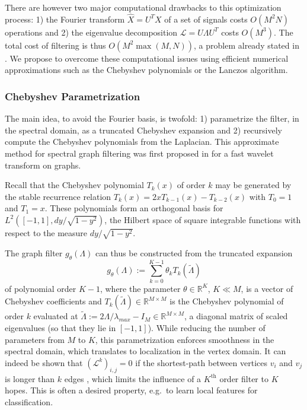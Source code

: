 \documentclass{article}
\renewcommand{\L}{\mathcal{L}}
\newcommand{\R}{\mathbb{R}}
\newcommand{\Xh}{\hat{X}}
\begin{document}
There are however two major computational drawbacks to this optimization
process: 1) the Fourier transform \(\Xh=U^TX\) of a set of signals costs
\(O(M^2N)\) operations and 2) the eigenvalue decomposition
\(\L = U \Lambda U^T\) costs \(O(M^3)\). The total cost of filtering is
thus \(O(M^2 \max(M,N))\), a problem already stated in
\citep{henaff_deep_2015}. We propose to overcome these computational
issues using efficient numerical approximations such as the Chebyshev
polynomials or the Lanczos algorithm.

\subsubsection{Chebyshev
Parametrization}\label{chebyshev-parametrization}

The main idea, to avoid the Fourier basis, is twofold: 1) parametrize
the filter, in the spectral domain, as a truncated Chebyshev expansion
and 2) recursively compute the Chebyshev polynomials from the Laplacian.
This approximate method for spectral graph filtering was first proposed
in \citep{hammond_wavelets_2011} for a fast wavelet transform on graphs.

Recall that the Chebyshev polynomial \(T_k(x)\) of order \(k\) may be
generated by the stable recurrence relation
\(T_k(x) = 2x T_{k-1}(x) - T_{k-2}(x)\) with \(T_0 = 1\) and
\(T_1 = x\). These polynomials form an orthogonal basis for
\(L^2([-1,1], dy / \sqrt{1-y^2})\), the Hilbert space of square
integrable functions with respect to the measure \(dy/\sqrt{1-y^2}\).

The graph filter \(g_\theta(\Lambda)\) can thus be constructed from the
truncated expansion
\[ g_\theta(\Lambda) := \sum_{k=0}^{K-1} \theta_k T_k(\tilde{\Lambda}) \]
of polynomial order \(K-1\), where the parameter \(\theta \in \R^K\),
\(K \ll M\), is a vector of Chebyshev coefficients and
\(T_k(\tilde{\Lambda}) \in \R^{M \times M}\) is the Chebyshev polynomial
of order \(k\) evaluated at
\(\tilde{\Lambda} := 2 \Lambda / \lambda_{max} - I_M \in \R^{M \times M}\),
a diagonal matrix of scaled eigenvalues (so that they lie in
\([-1,1]\)). While reducing the number of parameters from \(M\) to
\(K\), this parametrization enforces smoothness in the spectral domain,
which translates to localization in the vertex domain. It can indeed be
shown that \((\L^k)_{i,j}=0\) if the shortest-path between vertices
\(v_i\) and \(v_j\) is longer than \(k\) edges
\citep{hammond_wavelets_2011}, which limits the influence of a
\(K^\text{th}\) order filter to \(K\) hopes. This is often a desired
property, e.g.~to learn local features for classification.
\end{document}
